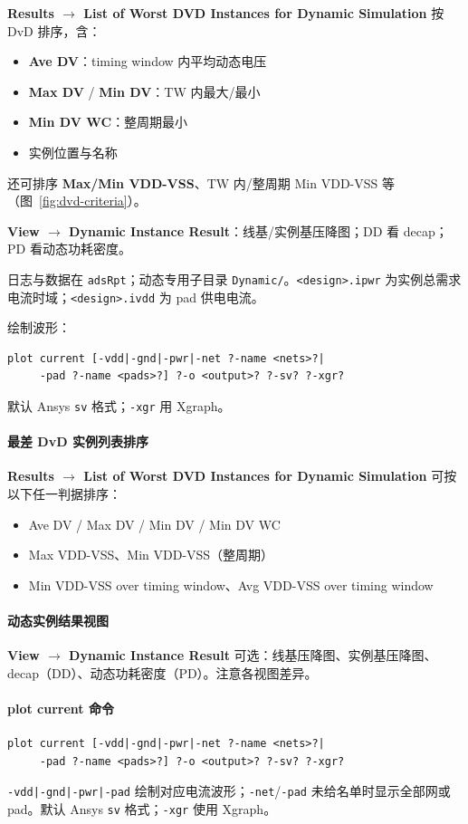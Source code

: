 \textbf{Results $\rightarrow$ List of Worst DVD Instances for Dynamic Simulation} 按 DvD 排序，含：
\begin{itemize}
  \item \textbf{Ave DV}：timing window 内平均动态电压
  \item \textbf{Max DV} / \textbf{Min DV}：TW 内最大/最小
  \item \textbf{Min DV WC}：整周期最小
  \item 实例位置与名称
\end{itemize}

还可排序 \textbf{Max/Min VDD-VSS}、TW 内/整周期 Min VDD-VSS 等（图~\ref{fig:dvd-criteria}）。

\label{fig:dvd-criteria}

\textbf{View $\rightarrow$ Dynamic Instance Result}：线基/实例基压降图；DD 看 decap；PD 看动态功耗密度。

日志与数据在 \texttt{adsRpt}；动态专用子目录 \texttt{Dynamic/}。\texttt{<design>.ipwr} 为实例总需求电流时域；\texttt{<design>.ivdd} 为 pad 供电电流。

绘制波形：
\begin{lstlisting}
plot current [-vdd|-gnd|-pwr|-net ?-name <nets>?|
     -pad ?-name <pads>?] ?-o <output>? ?-sv? ?-xgr?
\end{lstlisting}
默认 Ansys \texttt{sv} 格式；\texttt{-xgr} 用 Xgraph。
\paragraph{最差 DvD 实例列表排序}
\textbf{Results $\rightarrow$ List of Worst DVD Instances for Dynamic Simulation} 可按以下任一判据排序：
\begin{itemize}
  \item Ave DV / Max DV / Min DV / Min DV WC
  \item Max VDD-VSS、Min VDD-VSS（整周期）
  \item Min VDD-VSS over timing window、Avg VDD-VSS over timing window
\end{itemize}

\paragraph{动态实例结果视图}
\textbf{View $\rightarrow$ Dynamic Instance Result} 可选：线基压降图、实例基压降图、decap（DD）、动态功耗密度（PD）。注意各视图差异。

\paragraph{plot current 命令}
\begin{lstlisting}
plot current [-vdd|-gnd|-pwr|-net ?-name <nets>?|
     -pad ?-name <pads>?] ?-o <output>? ?-sv? ?-xgr?
\end{lstlisting}
\texttt{-vdd|-gnd|-pwr|-pad} 绘制对应电流波形；\texttt{-net}/\texttt{-pad} 未给名单时显示全部网或 pad。默认 Ansys \texttt{sv} 格式；\texttt{-xgr} 使用 Xgraph。

